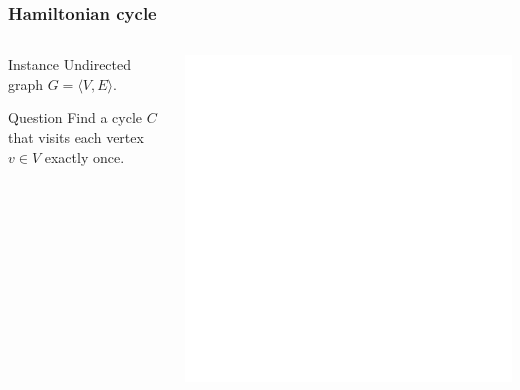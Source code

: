 \documentclass[12pt,aspectratio=169]{beamer}
\begin{document}
\begin{frame}\frametitle{Hamiltonian cycle}
\begin{columns} 
  \begin{column}{0.48\textwidth}
  \begin{block}{Instance}
    Undirected graph $G=\langle V,E \rangle$.
  \end{block}
  \begin{block}{Question}
    Find a cycle $C$ that visits each vertex  $v\in V$ exactly once.
%
  \end{block}
\end{column}
    \begin{column}{0.48\textwidth}
      \centering
  \includegraphics[height=0.7\textheight]{img/Grinberg_5CEC_Nonhamiltonian_graph}
\end{column}
\end{columns}
\end{frame}
\end{document}
